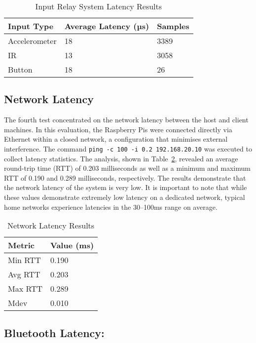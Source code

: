 \begin{table}[!ht]
    \centering
    \begin{tabular}{|l|l|l|}
    \hline
        Input Type & Average Latency (µs) & Samples \\ \hline
        Accelerometer & 18 & 3389 \\ \hline
        IR & 13 & 3058 \\ \hline
        Button & 18 & 26 \\ \hline
    \end{tabular}
    \caption{Input Relay System Latency Results}
    \label{table:inputrelay}

  \end{table}

\subsection{Network Latency}

The fourth test concentrated on the network latency between the host and client
machines. In this evaluation, the Raspberry Pis were connected directly via
Ethernet within a closed network, a configuration that minimises external
interference. The command \texttt{ping -c 100 -i 0.2 192.168.20.10} was executed to
collect latency statistics. The analysis, shown in Table~\ref{table:network},
revealed an average round-trip time (RTT) of 0.203 milliseconds as well as a
minimum and maximum RTT of 0.190 and 0.289 milliseconds, respectively. The results
demonstrate that the network latency of the system is very low. It is important to note that while these values demonstrate extremely low latency on a
dedicated network, typical home networks experience latencies in
the 30–100ms range on average\cite{latencySurvey}.

\begin{table}[!ht]
    \centering
    \begin{tabular}{|l|l|}
    \hline
        Metric & Value (ms) \\ \hline
        Min RTT & 0.190 \\ \hline
        Avg RTT & 0.203 \\ \hline
        Max RTT & 0.289 \\ \hline
        Mdev & 0.010 \\ \hline
    \end{tabular}
    \caption{Network Latency Results}
    \label{table:network}
\end{table}


\subsection{Bluetooth Latency:}

